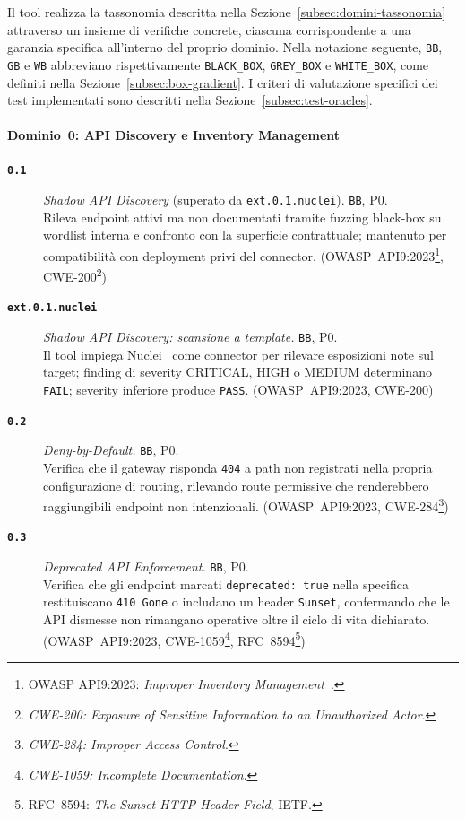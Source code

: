 Il tool realizza la tassonomia descritta nella Sezione~\ref{subsec:domini-tassonomia} attraverso un insieme di verifiche concrete, ciascuna corrispondente a una garanzia specifica all'interno del proprio dominio. Nella notazione seguente, \texttt{BB}, \texttt{GB} e \texttt{WB} abbreviano rispettivamente \texttt{BLACK\_BOX}, \texttt{GREY\_BOX} e \texttt{WHITE\_BOX}, come definiti nella Sezione~\ref{subsec:box-gradient}. I criteri di valutazione specifici dei test implementati sono descritti nella Sezione~\ref{subsec:test-oracles}.

\paragraph{Dominio~0: API Discovery e Inventory Management}
\begin{description}
      \item[\textbf{\texttt{0.1}}]
            \textit{Shadow API Discovery} (superato da \texttt{ext.0.1.nuclei}). \texttt{BB}, P0.\\
            Rileva endpoint attivi ma non documentati tramite fuzzing black-box su wordlist interna e confronto con la superficie contrattuale; mantenuto per compatibilità con deployment privi del connector.
            (\gls{OWASP}~API9:2023\footnote{\gls{OWASP} API9:2023: \textit{Improper Inventory Management}~\cite{OWASPTop10}.}, \gls{CWE}-200\footnote{\textit{CWE-200: Exposure of Sensitive Information to an Unauthorized Actor}.})

      \item[\textbf{\texttt{ext.0.1.nuclei}}]
            \textit{Shadow API Discovery: scansione a template.} \texttt{BB}, P0.\\
            Il tool impiega Nuclei~\cite{ProjectdiscoveryNuclei2026} come connector per rilevare esposizioni note sul target; finding di severity CRITICAL, HIGH o MEDIUM determinano \texttt{FAIL}; severity inferiore produce \texttt{PASS}.
            (\gls{OWASP}~API9:2023, \gls{CWE}-200)

      \item[\textbf{\texttt{0.2}}]
            \textit{Deny-by-Default.} \texttt{BB}, P0.\\
            Verifica che il gateway risponda \texttt{404} a path non registrati nella propria configurazione di routing, rilevando route permissive che renderebbero raggiungibili endpoint non intenzionali.
            (\gls{OWASP}~API9:2023, \gls{CWE}-284\footnote{\textit{CWE-284: Improper Access Control}.})

      \item[\textbf{\texttt{0.3}}]
            \textit{Deprecated API Enforcement.} \texttt{BB}, P0.\\
            Verifica che gli endpoint marcati \texttt{deprecated:~true} nella specifica restituiscano \texttt{410~Gone} o includano un header \texttt{Sunset}, confermando che le \gls{API} dismesse non rimangano operative oltre il ciclo di vita dichiarato.
            (\gls{OWASP}~API9:2023, \gls{CWE}-1059\footnote{\textit{CWE-1059: Incomplete Documentation}.}, \gls{RFC}~8594\footnote{\gls{RFC}~8594: \textit{The Sunset HTTP Header Field}, IETF.})
\end{description}

